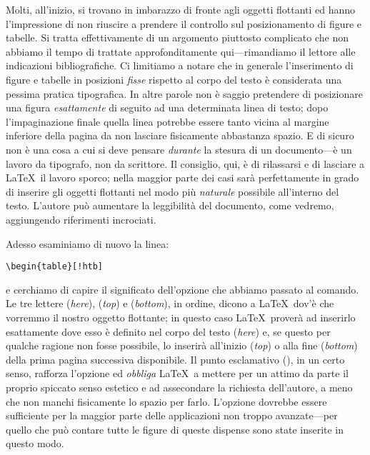 Molti, all'inizio, si trovano in imbarazzo di fronte agli oggetti flottanti
ed hanno l'impressione di non riuscire a prendere il controllo sul
posizionamento di figure e tabelle. Si tratta effettivamente di un argomento
piuttosto complicato che non abbiamo il tempo di trattate approfonditamente
qui---rimandiamo il lettore alle indicazioni bibliografiche.
Ci limitiamo a notare che in generale l'inserimento di figure e tabelle in
posizioni \emph{fisse} rispetto al corpo del testo \`e considerata una pessima
pratica tipografica. In altre parole non \`e saggio pretendere di
posizionare una figura \emph{esattamente} di seguito ad una determinata linea
di testo; dopo l'impaginazione finale quella linea potrebbe essere tanto
vicina al margine inferiore della pagina da non lasciare fisicamente
abbastanza spazio. E di sicuro non \`e una cosa a cui si deve pensare
\emph{durante} la stesura di un documento---\`e un lavoro da tipografo, non
da scrittore.
Il consiglio, qui, \`e di rilassarsi e di lasciare a \LaTeX\ il lavoro
sporco; nella maggior parte dei casi sar\`a perfettamente in grado di
inserire gli oggetti flottanti nel modo pi\`u \emph{naturale} possibile
all'interno del testo. L'autore pu\`o aumentare la leggibilit\`a del
documento, come vedremo, aggiungendo riferimenti incrociati.

Adesso esaminiamo di nuovo la linea:
\begin{verbatim}
\begin{table}[!htb]
\end{verbatim}
e cerchiamo di capire il significato dell'opzione  che abbiamo
passato al comando. Le tre lettere  (\emph{here}),
 (\emph{top}) e  (\emph{bottom}),
in ordine, dicono a \LaTeX\ dov'\`e che vorremmo il nostro oggetto
flottante; in questo caso \LaTeX\ prover\`a ad inserirlo esattamente
dove esso \`e definito nel corpo del testo (\emph{here}) e, se questo
per qualche ragione non fosse possibile, lo inserir\`a all'inizio (\emph{top})
o alla fine (\emph{bottom}) della prima pagina successiva disponibile.
Il punto esclamativo (\cchar{!}), in un certo senso, rafforza l'opzione ed
\emph{obbliga} \LaTeX\ a mettere per un attimo da parte il proprio spiccato
senso estetico e ad assecondare la richiesta dell'autore, a meno che non
manchi fisicamente lo spazio per farlo.
L'opzione  dovrebbe essere sufficiente per la maggior parte
delle applicazioni non troppo avanzate---per quello che pu\`o contare tutte
le figure di queste dispense sono state inserite in questo modo.


